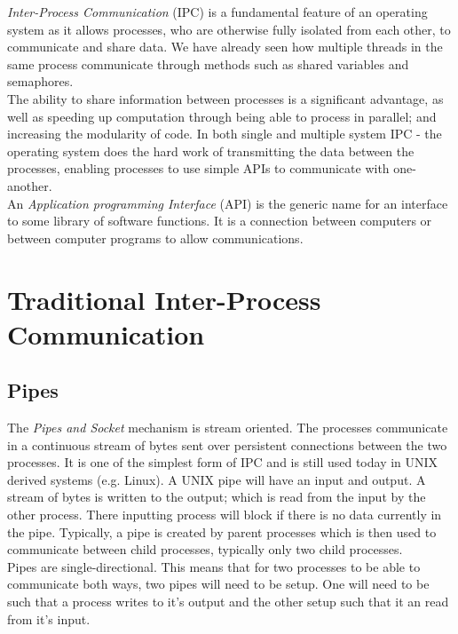 
\textit{Inter-Process Communication} (IPC) is a fundamental feature of an operating system as it allows processes, who are otherwise fully isolated from each other, to communicate and share data. We have already seen how multiple threads in the same process communicate through methods such as shared variables and semaphores.\\

The ability to share information between processes is a significant advantage, as well as speeding up computation through being able to process in parallel; and increasing the modularity of code. In both single and multiple system IPC - the operating system does the hard work of transmitting the data between the processes, enabling processes to use simple APIs to communicate with one-another.\\

An \textit{Application programming Interface} (API) is the generic name for an interface to some library of software functions. It is a connection between computers or between computer programs to allow communications.

\section{Traditional Inter-Process Communication}
\subsection{Pipes}
The \textit{Pipes and Socket} mechanism is stream oriented. The processes communicate in a continuous stream of bytes sent over persistent connections between the two processes. It is one of the simplest form of IPC and is still used today in UNIX derived systems (e.g. Linux). A UNIX pipe will have an input and output. A stream of bytes is written to the output; which is read from the input by the other process. There inputting process will block if there is no data currently in the pipe. Typically, a pipe is created by parent processes which is then used to communicate between child processes, typically only two child processes.\\

Pipes are single-directional. This means that for two processes to be able to communicate both ways, two pipes will need to be setup. One will need to be such that a process writes to it's output and the other setup such that it an read from it's input.\\

